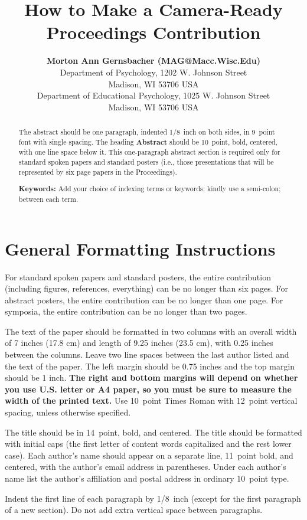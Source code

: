 \documentclass[10pt,letterpaper]{article}
\title{How to Make a Camera-Ready Proceedings Contribution}
\author{{\large \bf Morton Ann Gernsbacher (MAG@Macc.Wisc.Edu)} \\
  Department of Psychology, 1202 W. Johnson Street \\
  Madison, WI 53706 USA
  \AND {\large \bf Sharon J. Derry (SDJ@Macc.Wisc.Edu)} \\
  Department of Educational Psychology, 1025 W. Johnson Street \\
  Madison, WI 53706 USA}
\begin{document}
\maketitle


\begin{abstract}
The abstract should be one paragraph, indented 1/8~inch on both sides,
in 9~point font with single spacing. The heading {\bf Abstract} should
be 10~point, bold, centered, with one line space below it. This
one-paragraph abstract section is required only for standard spoken
papers and standard posters (i.e., those presentations that will be
represented by six page papers in the Proceedings).

\textbf{Keywords:} 
Add your choice of indexing terms or keywords; kindly use a semi-colon; between each term.
\end{abstract}


\section{General Formatting Instructions}

For standard spoken papers and standard posters, the entire contribution (including figures, references, everything) can be no longer than six pages. For abstract posters, the entire contribution can be no longer than one page. For symposia, the entire contribution can be no longer than two pages.

The text of the paper should be formatted in two columns with an
overall width of 7 inches (17.8 cm) and length of 9.25 inches (23.5
cm), with 0.25 inches between the columns. Leave two line spaces
between the last author listed and the text of the paper. The left
margin should be 0.75 inches and the top margin should be 1 inch.
\textbf{The right and bottom margins will depend on whether you use
  U.S. letter or A4 paper, so you must be sure to measure the width of
  the printed text.} Use 10~point Times Roman with 12~point vertical
spacing, unless otherwise specified.

The title should be in 14~point, bold, and centered. The title should
be formatted with initial caps (the first letter of content words
capitalized and the rest lower case). Each author's name should appear
on a separate line, 11~point bold, and centered, with the author's
email address in parentheses. Under each author's name list the
author's affiliation and postal address in ordinary 10~point type.

Indent the first line of each paragraph by 1/8~inch (except for the
first paragraph of a new section). Do not add extra vertical space
between paragraphs.
\end{document}
